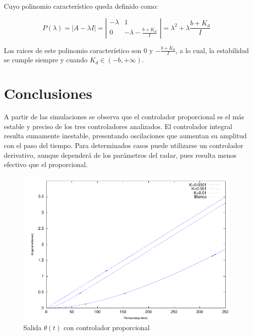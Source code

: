 \documentclass{sig-alternate}
\begin{document}
Cuyo polinomio caracter\'istico queda definido como:

\begin{equation}
 P( \lambda ) = |A - \lambda I| = 
\left| \begin{array}{cc}
- \lambda & 1 \\
0 & - \lambda - \frac{b+K_d}{I}
\end{array} \right| 
=
\lambda^2 + \lambda \frac{b+K_d}{I}
\end{equation}

Las raices de este polinomio caracter\'istico son $0$ y $-\frac{b+K_d}{I}$, a lo cual, 
la estabilidad se cumple siempre y cuando $K_d \in (-b, +\infty)$.

\section{Conclusiones}\label{conclusiones}
A partir de las simulaciones se observa que el controlador proporcional es el
m\'{a}s estable y preciso de los tres controladores analizados. El
controlador integral resulta sumamente inestable, presentando oscilaciones
que aumentan su amplitud con el paso del tiempo. Para determinados casos puede
utilizarse un controlador derivativo, aunque depender\'{a} de los par\'{a}metros
del radar, pues resulta menos efectivo que el proporcional.

\begin{figure}[hp]
\label{mProporcional}
\centering
\includegraphics[scale=0.8]{graficos/mProporcional}
\caption{Salida $\theta(t)$ con controlador proporcional}
\end{figure}
\end{document}

